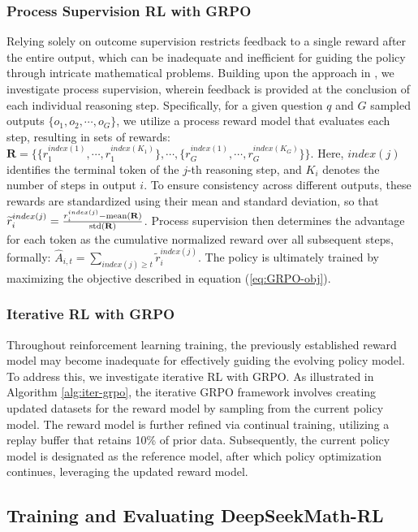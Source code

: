 \begin{itemize}[topsep=0pt]
\begin{itemize}[topsep=0pt]
\subsubsection{Process Supervision RL with GRPO}  
Relying solely on outcome supervision restricts feedback to a single reward after the entire output, which can be inadequate and inefficient for guiding the policy through intricate mathematical problems. Building upon the approach in \cite{wang2023math}, we investigate process supervision, wherein feedback is provided at the conclusion of each individual reasoning step. Specifically, for a given question $q$ and $G$ sampled outputs $\{o_1, o_2, \cdots, o_G\}$, we utilize a process reward model that evaluates each step, resulting in sets of rewards: $\mathbf{R} = \{ \{r_1^{index(1)},\cdots,r_1^{index(K_1)}\}, \cdots,  \{r_G^{index(1)},\cdots,r_G^{index(K_G)}\} \}$. Here, $index(j)$ identifies the terminal token of the $j$-th reasoning step, and $K_i$ denotes the number of steps in output $i$. To ensure consistency across different outputs, these rewards are standardized using their mean and standard deviation, so that $\widetilde{r}_i^{index(j)} = \frac{r_i^{index(j)} - {\rm mean(\mathbf{R})}}{{\rm std(\mathbf{R})}}$.
Process supervision then determines the advantage for each token as the cumulative normalized reward over all subsequent steps, formally: $\hat{A}_{i, t} = \sum_{index(j) \ge t} \widetilde{r}_i^{index(j)}$.
The policy is ultimately trained by maximizing the objective described in equation (\ref{eq:GRPO-obj}).

\subsubsection{Iterative RL with GRPO} Throughout reinforcement learning training, the previously established reward model may become inadequate for effectively guiding the evolving policy model. To address this, we investigate iterative RL with GRPO. As illustrated in Algorithm \ref{alg:iter-grpo}, the iterative GRPO framework involves creating updated datasets for the reward model by sampling from the current policy model. The reward model is further refined via continual training, utilizing a replay buffer that retains 10\% of prior data. Subsequently, the current policy model is designated as the reference model, after which policy optimization continues, leveraging the updated reward model.

\subsection{Training and Evaluating DeepSeekMath-RL}


\end{itemize}
\end{itemize}
